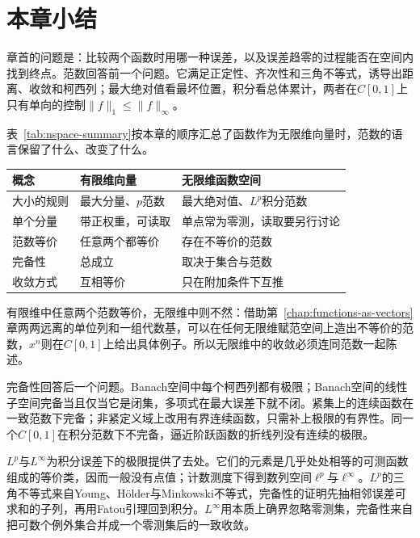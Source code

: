 \section{本章小结}
\label{sec:nspace-summary}

章首的问题是：比较两个函数时用哪一种误差，以及误差趋零的过程能否在空间内找到终点。范数回答前一个问题。它满足正定性、齐次性和三角不等式，诱导出距离、收敛和柯西列；最大绝对值看最坏位置，积分看总体累计，两者在$C[0,1]$上只有单向的控制$\lVert f\rVert_1\leq\lVert f\rVert_\infty$。

表~\ref{tab:nspace-summary}按本章的顺序汇总了函数作为无限维向量时，范数的语言保留了什么、改变了什么。

\begin{BookInlineTable}
  \centering
  \begin{tabular}{@{}p{22mm}p{36mm}p{44mm}@{}}
    \toprule
    概念 & 有限维向量 & 无限维函数空间\\
    \midrule
    大小的规则 & 最大分量、$p$范数 & 最大绝对值、$L^p$积分范数\\
    单个分量 & 带正权重，可读取 & 单点常为零测，读取要另行讨论\\
    范数等价 & 任意两个都等价 & 存在不等价的范数\\
    完备性 & 总成立 & 取决于集合与范数\\
    收敛方式 & 互相等价 & 只在附加条件下互推\\
    \bottomrule
  \end{tabular}
  \caption{范数的语言在有限维向量与无限维函数空间中的对照。}
  \label{tab:nspace-summary}
\end{BookInlineTable}

有限维中任意两个范数等价，无限维中则不然：借助第~\ref{chap:functions-as-vectors}章两两远离的单位列和一组代数基，可以在任何无限维赋范空间上造出不等价的范数，$x^n$则在$C[0,1]$上给出具体例子。所以无限维中的收敛必须连同范数一起陈述。

完备性回答后一个问题。Banach空间中每个柯西列都有极限；Banach空间的线性子空间完备当且仅当它是闭集，多项式在最大误差下就不闭。紧集上的连续函数在一致范数下完备；非紧定义域上改用有界连续函数，只需补上极限的有界性。同一个$C[0,1]$在积分范数下不完备，逼近阶跃函数的折线列没有连续的极限。

$L^p$与$L^\infty$为积分误差下的极限提供了去处。它们的元素是几乎处处相等的可测函数组成的等价类，因而一般没有点值；计数测度下得到数列空间$\ell^p$与$\ell^\infty$。$L^p$的三角不等式来自Young、Hölder与Minkowski不等式，完备性的证明先抽相邻误差可求和的子列，再用Fatou引理回到积分。$L^\infty$用本质上确界忽略零测集，完备性来自把可数个例外集合并成一个零测集后的一致收敛。

